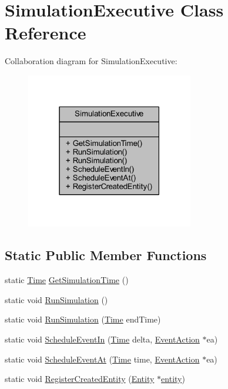 \hypertarget{class_simulation_executive}{}\section{Simulation\+Executive Class Reference}
\label{class_simulation_executive}


Collaboration diagram for Simulation\+Executive\+:\nopagebreak
\begin{figure}[H]
\begin{center}
\leavevmode
\includegraphics[width=207pt]{class_simulation_executive__coll__graph}
\end{center}
\end{figure}
\subsection*{Static Public Member Functions}
\begin{DoxyCompactItemize}
\item 
static \hyperlink{_simulation_executive_8h_ac2d3e0ba793497bcca555c7c2cf64ff3}{Time} \hyperlink{class_simulation_executive_aae5817b0bb67ac5453f3953174d20d9a}{Get\+Simulation\+Time} ()
\item 
static void \hyperlink{class_simulation_executive_aefcd760dfa5abac47f90871218f5a142}{Run\+Simulation} ()
\item 
static void \hyperlink{class_simulation_executive_aeb51e8a0457a294919d1b02068606e14}{Run\+Simulation} (\hyperlink{_simulation_executive_8h_ac2d3e0ba793497bcca555c7c2cf64ff3}{Time} end\+Time)
\item 
static void \hyperlink{class_simulation_executive_ac3d1456a2f8384c22e0fce64741eaba0}{Schedule\+Event\+In} (\hyperlink{_simulation_executive_8h_ac2d3e0ba793497bcca555c7c2cf64ff3}{Time} delta, \hyperlink{class_event_action}{Event\+Action} $\ast$ea)
\item 
static void \hyperlink{class_simulation_executive_ad060de243e8cb89fd7c7217d0c98c5c9}{Schedule\+Event\+At} (\hyperlink{_simulation_executive_8h_ac2d3e0ba793497bcca555c7c2cf64ff3}{Time} time, \hyperlink{class_event_action}{Event\+Action} $\ast$ea)
\item 
static void \hyperlink{class_simulation_executive_a6b97d77619c537a462c53ad32ed95004}{Register\+Created\+Entity} (\hyperlink{class_entity}{Entity} $\ast$\hyperlink{_entity_8h_ad79a57ed3105eb60d991a1aeb4a9dc44a428e8fcd53019fa239fa3419261e499e}{entity})
\end{DoxyCompactItemize}


